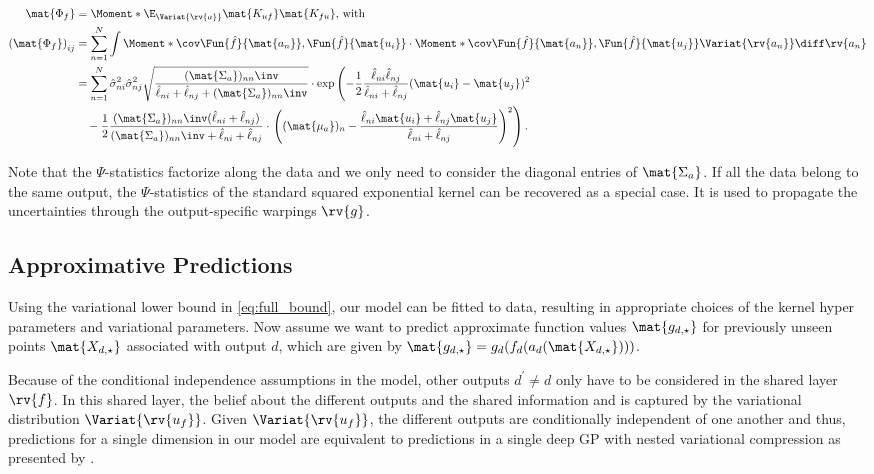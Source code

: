 \documentclass{article}
\begin{document}
\begin{align}
\begin{split}
    \mat{\Phi_f} &= \Moment*{\E_{\Variat{\rv{a}}}}{\mat{K_{uf}}\mat{K_{fu}}}\text{, with} \\
    \left(\mat{\Phi_f} \right)_{ij} &= \sum_{n=1}^N \int \Moment*{\cov}{\Fun{\hat{f}}{\mat{a_n}}, \Fun{\hat{f}}{\mat{u_i}}}
    \cdot \Moment*{\cov}{\Fun{\hat{f}}{\mat{a_n}}, \Fun{\hat{f}}{\mat{u_j}}} \Variat{\rv{a_n}} \diff \rv{a_n} \\
    &= \sum_{n=1}^N \hat{\sigma}_{ni}^2 \hat{\sigma}_{nj}^2 \sqrt{\frac{(\mat{\Sigma_a})_{nn}\inv}{\hat{\ell}_{ni} + \hat{\ell}_{nj} + (\mat{\Sigma_a})_{nn}\inv}}
    \cdot \exp\left( -\frac{1}{2} \frac{\hat{\ell}_{ni}\hat{\ell}_{nj}}{\hat{\ell}_{ni} + \hat{\ell}_{nj}} (\mat{u_i} - \mat{u_j})^2 \right. \\
    &\quad {} - \frac{1}{2} \frac{(\mat{\Sigma_a})_{nn}\inv(\hat{\ell}_{ni} + \hat{\ell}_{nj})}{(\mat{\Sigma_a})_{nn}\inv + \hat{\ell}_{ni} + \hat{\ell}_{nj}}
    \cdot \left.\left( (\mat{\mu_a})_n - \frac{\hat{\ell}_{ni} \mat{u_i} + \hat{\ell}_{nj} \mat{u_j}}{\hat{\ell}_{ni} + \hat{\ell}_{nj}} \right)^2 \right).
\end{split}
\end{align}

Note that the $\Psi$-statistics factorize along the data and we only need to consider the diagonal entries of $\mat{\Sigma_a}$.
If all the data belong to the same output, the $\Psi$-statistics of the standard squared exponential kernel can be recovered as a special case.
It is used to propagate the uncertainties through the output-specific warpings $\rv{g}$.


\subsection{Approximative Predictions}
\label{subsec:predictions}
Using the variational lower bound in \cref{eq:full_bound}, our model can be fitted to data, resulting in appropriate choices of the kernel hyper parameters and variational parameters.
Now assume we want to predict approximate function values $\mat{g_{d, \star}}$ for previously unseen points $\mat{X_{d, \star}}$ associated with output $d$, which are given by $ \mat{g_{d, \star}} = g_d(f_d(a_d(\mat{X_{d, \star}})))$.

Because of the conditional independence assumptions in the model, other outputs $d^\prime \neq d$ only have to be considered in the shared layer $\rv{f}$.
In this shared layer, the belief about the different outputs and the shared information and is captured by the variational distribution $\Variat{\rv{u_f}}$.
Given $\Variat{\rv{u_f}}$, the different outputs are conditionally independent of one another and thus, predictions for a single dimension in our model are equivalent to predictions in a single deep GP with nested variational compression as presented by \textcite{hensman_nested_2014}.
\end{document}
